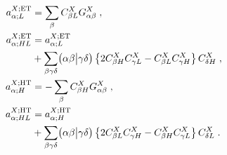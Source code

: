 \begin{subequations}\label{e:a:aoep}
\begin{align}
%
a_{\alpha;L}^{X;{\rm ET}} &= \sum_\beta C_{\beta L}^X G_{\alpha\beta}^X \;,\\
%
a_{\alpha;HL}^{X;{\rm ET}} &= a_{\alpha;L}^{X;{\rm ET}} \nonumber \\
 &+\sum_{\beta\gamma\delta} \braket{\alpha\beta}{\gamma\delta}
 \left\{ 2C^X_{\beta  H} C^X_{\gamma L} - C^X_{\beta  L} C^X_{\gamma H}\right\} C^X_{\delta H} \;,\\
%
a_{\alpha;H}^{X;{\rm HT}} &=-\sum_\beta C_{\beta H}^X G_{\alpha\beta}^X \;,\\
%
a_{\alpha;HL}^{X;{\rm HT}} &=a_{\alpha;H}^{X;{\rm HT}} \nonumber \\
 &+\sum_{\beta\gamma\delta} \braket{\alpha\beta}{\gamma\delta}
 \left\{ 2C^X_{\beta  L} C^X_{\gamma H} - C^X_{\beta  H} C^X_{\gamma L}\right\} C^X_{\delta L} \;.
%
\end{align}
\end{subequations}
